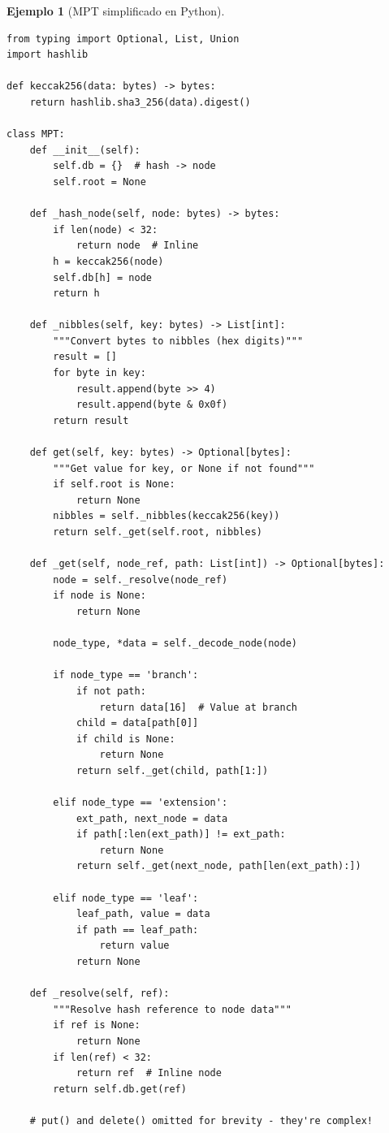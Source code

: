 \documentclass[11pt,a4paper,twoside,openright]{book}
\theoremstyle{definition}
\newtheorem{example}{Ejemplo}[chapter]
\theoremstyle{plain}
\theoremstyle{remark}
\begin{document}
\begin{example}[MPT simplificado en Python]
\begin{verbatim}
from typing import Optional, List, Union
import hashlib

def keccak256(data: bytes) -> bytes:
    return hashlib.sha3_256(data).digest()

class MPT:
    def __init__(self):
        self.db = {}  # hash -> node
        self.root = None
    
    def _hash_node(self, node: bytes) -> bytes:
        if len(node) < 32:
            return node  # Inline
        h = keccak256(node)
        self.db[h] = node
        return h
    
    def _nibbles(self, key: bytes) -> List[int]:
        """Convert bytes to nibbles (hex digits)"""
        result = []
        for byte in key:
            result.append(byte >> 4)
            result.append(byte & 0x0f)
        return result
    
    def get(self, key: bytes) -> Optional[bytes]:
        """Get value for key, or None if not found"""
        if self.root is None:
            return None
        nibbles = self._nibbles(keccak256(key))
        return self._get(self.root, nibbles)
    
    def _get(self, node_ref, path: List[int]) -> Optional[bytes]:
        node = self._resolve(node_ref)
        if node is None:
            return None
        
        node_type, *data = self._decode_node(node)
        
        if node_type == 'branch':
            if not path:
                return data[16]  # Value at branch
            child = data[path[0]]
            if child is None:
                return None
            return self._get(child, path[1:])
        
        elif node_type == 'extension':
            ext_path, next_node = data
            if path[:len(ext_path)] != ext_path:
                return None
            return self._get(next_node, path[len(ext_path):])
        
        elif node_type == 'leaf':
            leaf_path, value = data
            if path == leaf_path:
                return value
            return None
    
    def _resolve(self, ref):
        """Resolve hash reference to node data"""
        if ref is None:
            return None
        if len(ref) < 32:
            return ref  # Inline node
        return self.db.get(ref)
    
    # put() and delete() omitted for brevity - they're complex!
\end{verbatim}
\end{example}
\end{document}
